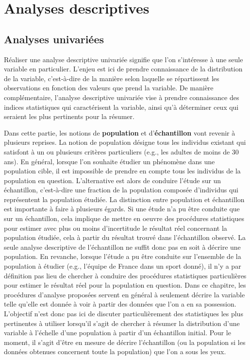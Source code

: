 \documentclass[
  french,
]{book}
\begin{document}
\hypertarget{part-analyses-descriptives}{%
\part{Analyses descriptives}\label{part-analyses-descriptives}}

\hypertarget{analyses-univariuxe9es}{%
\chapter{Analyses univariées}\label{analyses-univariuxe9es}}

Réaliser une analyse descriptive univariée signifie que l'on s'intéresse à une seule variable en particulier. L'enjeu est ici de prendre connaissance de la distribution de la variable, c'est-à-dire de la manière selon laquelle se répartissent les observations en fonction des valeurs que prend la variable. De manière complémentaire, l'analyse descriptive univariée vise à prendre connaissance des indices statistiques qui caractérisent la variable, ainsi qu'à déterminer ceux qui seraient les plus pertinents pour la résumer.

Dans cette partie, les notions de \textbf{population} et d'\textbf{échantillon} vont revenir à plusieurs reprises. La notion de population désigne tous les individus existant qui satisfont à un ou plusieurs critères particuliers (e.g., les adultes de moins de 30 ans). En général, lorsque l'on souhaite étudier un phénomène dans une population cible, il est impossible de prendre en compte tous les individus de la population en question. L'alternative est alors de conduire l'étude sur un échantillon, c'est-à-dire une fraction de la population composée d'individus qui représentent la population étudiée. La distinction entre population et échantillon est importante à faire à plusieurs égards. Si une étude n'a pu être conduite que sur un échantillon, cela implique de mettre en oeuvre des procédures statistiques pour estimer avec plus ou moins d'incertitude le résultat réel concernant la population étudiée, cela à partir du résultat trouvé dans l'échantillon observé. La seule analyse descriptive de l'échantillon ne suffit donc pas en soit à décrire une population. En revanche, lorsque l'étude a pu être conduite sur l'ensemble de la population à étudier (e.g., l'équipe de France dans un sport donné), il n'y a par définition pas lieu de chercher à conduire des procédures statistiques particulières pour estimer le résultat réel pour la population en question. Dans ce chapitre, les procédures d'analyse proposées servent en général à seulement décrire la variable telle qu'elle est donnée à voir à partir des données que l'on a en sa possession. L'objectif n'est donc pas ici de discuter particulièrement des statistiques les plus pertinentes à utiliser lorsqu'il s'agit de chercher à résumer la distribution d'une variable à l'échelle d'une population à partir d'un échantillon initial. Pour le moment, il s'agit d'être en mesure de décrire l'échantillon (ou la population si les données obtenues concernent toute la population) que l'on a sous les yeux.
\end{document}
